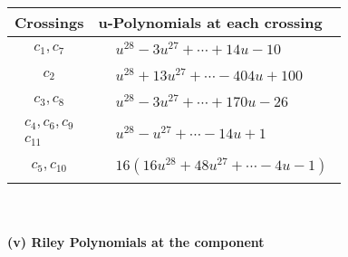 \documentclass[1p]{elsarticle_modified}
\theoremstyle{definition}
\begin{document}
\begin{tabular}{m{50pt}|m{274pt}}
Crossings & \hspace{64pt}u-Polynomials at each crossing \\
\hline $$\begin{aligned}c_{1},c_{7}\end{aligned}$$&$\begin{aligned}
&u^{28}-3 u^{27}+\cdots+14 u-10
\end{aligned}$\\
\hline $$\begin{aligned}c_{2}\end{aligned}$$&$\begin{aligned}
&u^{28}+13 u^{27}+\cdots-404 u+100
\end{aligned}$\\
\hline $$\begin{aligned}c_{3},c_{8}\end{aligned}$$&$\begin{aligned}
&u^{28}-3 u^{27}+\cdots+170 u-26
\end{aligned}$\\
\hline $$\begin{aligned}c_{4},c_{6},c_{9}\\c_{11}\end{aligned}$$&$\begin{aligned}
&u^{28}- u^{27}+\cdots-14 u+1
\end{aligned}$\\
\hline $$\begin{aligned}c_{5},c_{10}\end{aligned}$$&$\begin{aligned}
&16(16 u^{28}+48 u^{27}+\cdots-4 u-1)
\end{aligned}$\\
\hline
\end{tabular}\\~\\
\newpage\renewcommand{\arraystretch}{1}
\flushleft \textbf{(v) Riley Polynomials at the component}\newline \\
\end{document}
